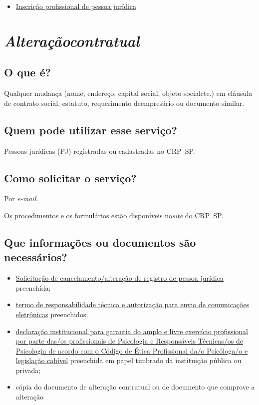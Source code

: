 \begin{itemize}
  \item  \hyperref[]{Inscrição  profissional de pessoa jurídica}
\end{itemize}

\chapter{\texorpdfstring{\emph{Alteraçãocontratual}}{Alteração contratual}}


\section{O que é?}

Qualquer mudança (nome, endereço, capital social, objeto socialetc.) em cláusula de contrato social, estatuto, requerimento deempresário ou documento similar.

\section{Quem pode utilizar esse serviço?}

Pessoas jurídicas (PJ) registradas ou cadastradas no CRP~SP.

\section{Como solicitar o serviço?}

Por \emph{e-mail}.

Os procedimentos e os formulários estão disponíveis no\href{https://www.crpsp.org/pagina/view/320}{\emph{site} do CRP~SP}.

\section{Que informações ou documentos são necessários?}

\begin{itemize}
  \item  \hyperref[]{Solicitação  de cancelamento/alteração de registro de pessoa jurídica} preenchida;
  \item  \hyperref[]{termo  de responsabilidade técnica e autorização para envio de comunicações  eletrônicas} preenchidos;
  \item  \hyperref[]{declaração  institucional para garantia do amplo e livre exercício profissional  por parte das/os profissionais de Psicologia e Responsáveis  Técnicas/os de Psicologia de acordo com o Código de Ética Profissional  da/o Psicóloga/o e legislação cabível} preenchida em papel timbrado da  instituição pública ou privada;
  \item  cópia do documento de alteração contratual ou de documento que  comprove a alteração
\end{itemize}

